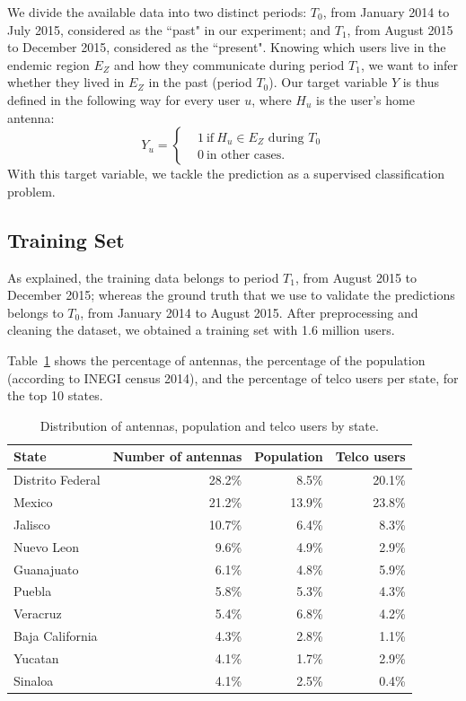 We divide the available data into two distinct periods:
$T_0$, from January 2014 to July 2015, considered as the ``past" in our experiment;
and $T_1$, from August 2015 to December 2015, considered as the ``present".
Knowing which users live in the endemic region $E_Z$ and how they communicate
during period $T_1$,
we want to infer whether they lived in $E_Z$ in the past (period $T_0$).
Our target variable $Y$ is thus defined in the following way for every user $u$,
where $H_u$ is the user's home antenna: 
\[
    Y_u =
      \begin{cases}
        &1 \ \mbox{if} \ H_u \in E_Z \mbox{ during } T_0 \\
        &0 \ \mbox{in other cases}.
      \end{cases}
    \]
With this target variable, we tackle the prediction as a supervised classification problem.



\subsection{Training Set}

As explained, the training data belongs to period $T_1$, from August 2015 to December 2015;
whereas the ground truth that we use to validate the predictions belongs to $T_0$, from January 2014 to August 2015.
After preprocessing and cleaning the dataset, we obtained 
a training set with 1.6 million users.

Table~\ref{tab:distribution_by_state} shows the percentage of antennas, the percentage of the population (according to INEGI census 2014), and
the percentage of telco users per state, for the top 10 states.


\begin{table}[ht]
\caption{Distribution of antennas, population and telco users by state.}
\label{tab:distribution_by_state}
\centering
\begin{tabular}{l r r r}
\toprule
State				& Number of antennas & Population 	& Telco users \\
\midrule
Distrito Federal    & 28.2\% 	& 8.5\%		& 20.1\%  \\
Mexico              & 21.2\%		&  13.9\% 	& 23.8\%  \\
Jalisco             & 10.7\% 	& 6.4\%		& 8.3\%   \\
Nuevo Leon          & 9.6\%	& 4.9\%		& 2.9\% \\
Guanajuato          & 6.1\%	& 4.8\%		& 5.9\% \\
Puebla              & 5.8\%	& 5.3\%		& 4.3\% \\
Veracruz            & 5.4\% 	& 6.8\%		& 4.2\% \\
Baja California     & 4.3\%	& 2.8\%		& 1.1\% \\
Yucatan             & 4.1\%	& 1.7\%		& 2.9\% \\
Sinaloa             & 4.1\%	& 2.5\%		& 0.4\% \\
\bottomrule
\end{tabular}
\end{table}

